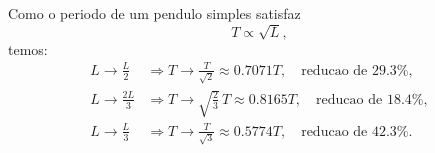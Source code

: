 Como o periodo de um pendulo simples satisfaz
\[
T \propto \sqrt{L},
\]
temos:
\begin{align*}
L \to \frac{L}{2} &\Rightarrow T \to \frac{T}{\sqrt{2}} \approx 0.7071T,
\quad \text{reducao de } 29.3\%, \\
L \to \frac{2L}{3} &\Rightarrow T \to \sqrt{\frac{2}{3}}\,T \approx 0.8165T,
\quad \text{reducao de } 18.4\%, \\
L \to \frac{L}{3} &\Rightarrow T \to \frac{T}{\sqrt{3}} \approx 0.5774T,
\quad \text{reducao de } 42.3\%.
\end{align*}

